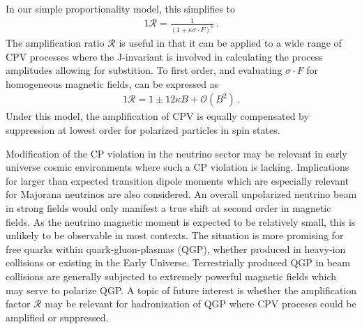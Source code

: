 In our simple proportionality model, this simplifies to
\begin{alignat}{1}
	\label{amp:2} \mathcal{R} = \frac{1}{\left(1+\kappa\sigma\cdot F\right)^{6}}\,.
\end{alignat}
The amplification ratio $\mathcal{R}$ is useful in that it can be applied to a wide range of CPV processes where the J-invariant is involved in calculating the process amplitudes allowing for substition. To first order, and evaluating $\sigma\cdot F$ for homogeneous magnetic fields,  can be expressed as
\begin{alignat}{1}
	\label{amp:3} \mathcal{R} = 1\pm12\kappa B+\mathcal{O}(B^{2})\,.
\end{alignat}
Under this model, the amplification of CPV is equally compensated by suppression at lowest order for polarized particles in spin states.

Modification of the CP violation in the neutrino sector may be relevant in early universe cosmic environments where such a CP violation is lacking. Implications for larger than expected transition dipole moments which are especially relevant for Majorana neutrinos are also considered. An overall unpolarized neutrino beam in strong fields would only manifest a true shift at second order in magnetic fields. As the neutrino magnetic moment is expected to be relatively small, this is unlikely to be observable in most contexts. The situation is more promising for free quarks within quark-gluon-plasmas (QGP), whether produced in heavy-ion collisions or existing in the Early Universe. Terrestrially produced QGP in beam collisions are generally subjected to extremely powerful magnetic fields which may serve to polarize QGP. A topic of future interest is whether the amplification factor $\mathcal{R}$ may be relevant for hadronization of QGP where CPV proceses could be amplified or suppressed.
